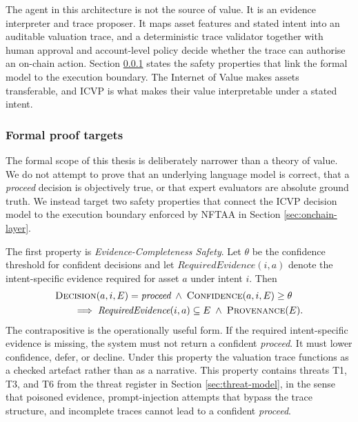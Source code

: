 The agent in this architecture is not the source of value. It is an evidence interpreter and trace proposer. It maps asset features and stated intent into an auditable valuation trace, and a deterministic trace validator together with human approval and account-level policy decide whether the trace can authorise an on-chain action. Section \ref{sec:proof-targets} states the safety properties that link the formal model to the execution boundary. The Internet of Value makes assets transferable, and ICVP is what makes their value interpretable under a stated intent.

\subsubsection{Formal proof targets}
\label{sec:proof-targets}

The formal scope of this thesis is deliberately narrower than a theory of value. We do not attempt to prove that an underlying language model is correct, that a \textit{proceed} decision is objectively true, or that expert evaluators are absolute ground truth. We instead target two safety properties that connect the ICVP decision model to the execution boundary enforced by NFTAA in Section \ref{sec:onchain-layer}.

The first property is \emph{Evidence-Completeness Safety}. Let $\theta$ be the confidence threshold for confident decisions and let $\textit{RequiredEvidence}(i, a)$ denote the intent-specific evidence required for asset $a$ under intent $i$. Then
\begin{equation}
\begin{aligned}
&\textsc{Decision}(a, i, E) = \textit{proceed}
  \;\wedge\; \textsc{Confidence}(a, i, E) \geq \theta \\
&\qquad\Longrightarrow\;
  \textit{RequiredEvidence}(i, a) \subseteq E
  \;\wedge\; \textsc{Provenance}(E).
\end{aligned}
\end{equation}
The contrapositive is the operationally useful form. If the required intent-specific evidence is missing, the system must not return a confident \textit{proceed}. It must lower confidence, defer, or decline. Under this property the valuation trace functions as a checked artefact rather than as a narrative. This property contains threats T1, T3, and T6 from the threat register in Section \ref{sec:threat-model}, in the sense that poisoned evidence, prompt-injection attempts that bypass the trace structure, and incomplete traces cannot lead to a confident \textit{proceed}.

